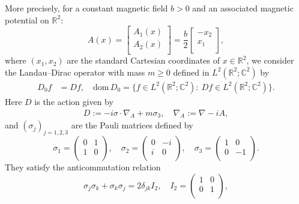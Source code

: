 \documentclass[11pt,a4paper,reqno,oneside]{amsproc}
\DeclareMathOperator{\dom}{dom}
\def \rr {{\mathbb R}}
\def \cc {{\mathbb C}}
\numberwithin{equation}{section}
\def\dom{\mathrm{dom}}
\def \cc {{\mathbb{C}}}
\begin{document}
More precisely, for a constant magnetic field $b>0$ and  an  associated magnetic potential on $\rr^2$: 
\[
A(x)=\begin{bmatrix}
A_1(x) \\                                              
A_2(x) \\                                            
\end{bmatrix}
=\frac{b}{2} \begin{bmatrix}
-x_2 \\                                              
x_1 \\                                            
\end{bmatrix},
\]
where $(x_1,x_2)$ are the standard Cartesian coordinates of $x\in\rr^2$, we consider the Landau--Dirac operator with mass $m\geq 0$ defined in $L^2(\mathbb{R}^2 ; \mathbb{C}^2)$  by
\begin{align*} %
D_0 f &= D f, \quad
\dom\, D_0 =  \{f\in L^2(\rr^2; \cc^2):\ D f \in L^2(\rr^2; \cc^2)\}.
\end{align*}  
Here $D$ is the action given by 
\begin{align*}\label{LandauDirac}
    D:= -i\sigma\cdot \nabla_A +m\sigma_3, \quad  \nabla_A:= \nabla-iA,
\end{align*}
and $(\sigma_j)_{j=1,2,3}$ are the Pauli matrices defined by
\begin{equation*} 
 \sigma_1 =  \begin{pmatrix}
0 & 1\\                                              
1 & 0 \\                                            
\end{pmatrix}, \quad  \sigma_2 = \begin{pmatrix}
0 & -i\\                                              
i & 0 \\                                            
\end{pmatrix}, \quad  \sigma_3 =  \begin{pmatrix}
1 & 0\\                                              
0 & -1 \\                                            
\end{pmatrix}.
\end{equation*}
They satisfy the anticommutation relation
\[
\sigma_j\sigma_k +\sigma_k\sigma_j=2 \delta_{jk}I_2, \quad I_2= \begin{pmatrix}
1 & 0\\                                              
0 & 1 \\                                            
\end{pmatrix},
\]
\end{document}
